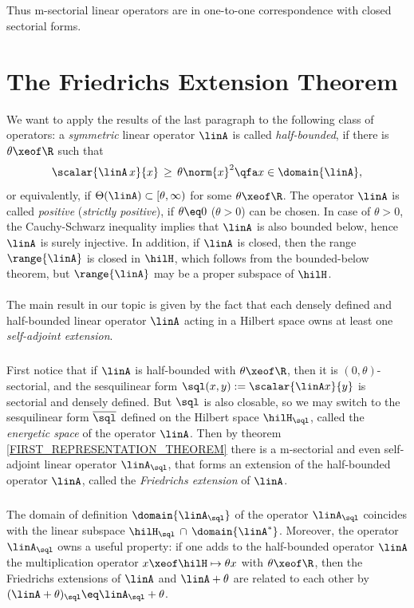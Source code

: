 \documentclass[11pt,twoside]{article}
\begin{document}
\subparagraph{}
Thus m-sectorial linear operators are in one-to-one correspondence
with closed sectorial forms.

\section{The Friedrichs Extension Theorem}
We want to apply the results of the last paragraph
to the following class of operators:
a \textit{symmetric} linear operator $\linA$ is called \textit{half-bounded},
if there is $\theta \xeof \R$ such that
\[
\scalar{\linA \,x}{x} \, \geq \, \theta \norm{x}^2
\qfa x \in \domain{\linA},
\]
or equivalently,
if $\Theta(\linA) \subset [\theta,\infty)$ for some $\theta \xeof \R$.
The operator $\linA$ is called \textit{positive} (\textit{strictly positive}),
if $\theta \eq 0$ ($\theta > 0$) can be chosen.
In case of $\theta > 0$,
the {Cauchy-Schwarz} inequality implies
that $\linA$ is also bounded below,
hence $\linA$ is surely injective.
In addition,
if $\linA$ is closed,
then the range $\range{\linA}$ is closed in $\hilH$,
which follows from the bounded-below theorem,
but $\range{\linA}$ may be a proper subspace of $\hilH$.

\paragraph{} %
The main result in our topic is given by the fact
that each densely defined and half-bounded linear operator $\linA$
acting in a Hilbert space owns at least one \textit{self-adjoint extension}.

\subparagraph{}
First notice that if $\linA$ is half-bounded with $\theta \xeof \R$,
then it is $(0,\theta)$-sectorial,
and the sesquilinear form $\sql(x,y) := \scalar{\linA x}{y}$
is sectorial and densely defined.
But $\sql$ is also closable,
so we may switch to the sesquilinear form $\overline{\sql}$ defined on the
Hilbert space $\hilH_{\sql}$,
called the \textit{energetic space} of the operator $\linA$.
Then by theorem \ref{FIRST_REPRESENTATION_THEOREM}
there is a m-sectorial and even self-adjoint linear operator $\linA_{\sql}$,
that forms an extension of the half-bounded operator $\linA$,
called the \textit{Friedrichs extension} of $\linA$.

\subparagraph{}
The domain of definition $\domain{\linA_{\sql}}$ of the operator $\linA_{\sql}$
coincides with the linear subspace $\hilH_{\sql} \, \cap \, \domain{\linA^*}$.
Moreover,
the operator $\linA_{\sql}$ owns a useful property:
if one adds to the half-bounded operator $\linA$ the multiplication operator 
$x \xeof \hilH \mapsto \theta x$ with $\theta \xeof \R$,
then the {Friedrichs} extensions of $\linA$ and $\linA + \theta$
are related to each other by
$(\linA + \theta)_{\sql} \eq \linA_{\sql} + \theta$.
\end{document}
